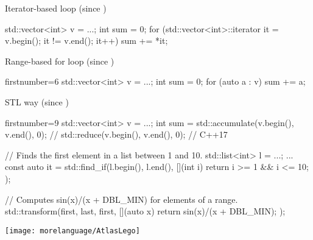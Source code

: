 
\begin{frame}[fragile]
  \begin{block}{Iterator-based loop (since )}
    \begin{cppcode*}{}
      std::vector<int> v = ...;
      int sum = 0;
      for (std::vector<int>::iterator it = v.begin();
           it != v.end(); it++)
        sum += *it;
    \end{cppcode*}
  \end{block}
  \pause
  \begin{block}{Range-based for loop (since )}
    \begin{cppcode*}{firstnumber=6}
      std::vector<int> v = ...;
      int sum = 0;
      for (auto a : v) { sum += a; }
    \end{cppcode*}
  \end{block}
  \pause
  \begin{exampleblock}{STL way (since )}
    \begin{cppcode*}{firstnumber=9}
      std::vector<int> v = ...;
      int sum = std::accumulate(v.begin(), v.end(), 0);
      // std::reduce(v.begin(), v.end(), 0); // C++17
    \end{cppcode*}
  \end{exampleblock}
\end{frame}

\begin{frame}[fragile]
  \begin{cppcode}
    // Finds the first element in a list between 1 and 10.
    std::list<int> l = ...;
    ...
    const auto it =
      std::find_if(l.begin(), l.end(),
        [](int i) { return i >= 1 && i <= 10; });

    // Computes sin(x)/(x + DBL_MIN) for elements of a range.
    std::transform(first, last, first,
      [](auto x) { return sin(x)/(x + DBL_MIN); });
  \end{cppcode}
\end{frame}

\begin{frame}[fragile]
  \begin{block}{}
    \texttt{[image: morelanguage/AtlasLego]}
  \end{block}
\end{frame}

